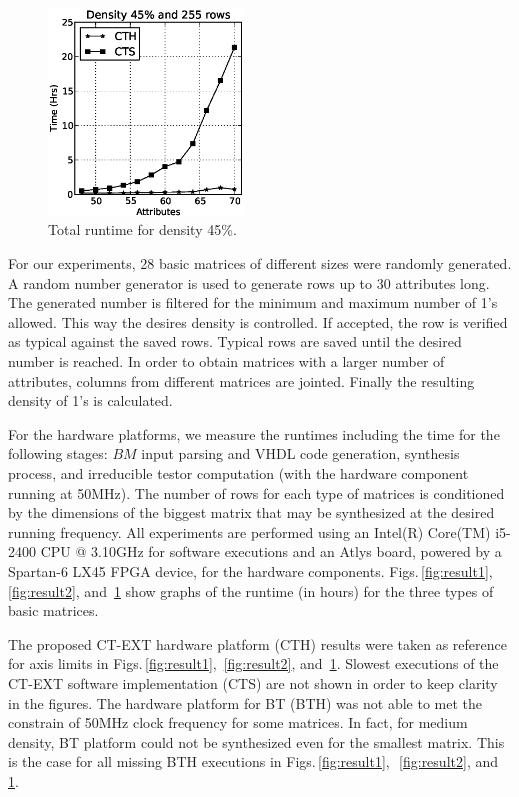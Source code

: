 \documentclass[authoryear,preprint,review,12pt]{elsarticle}
\begin{document}
\begin{figure}[htb]
    \begin{center}
       \includegraphics[height=5.5cm]{med48_density.eps}
    \end{center}
\caption{Total runtime for density 45\%.}
\label{fig:result3}
\end{figure}

For our experiments, 28 basic matrices of different sizes were randomly generated. 
A random number generator is used to generate rows up to 30 attributes long. The generated number is 
filtered for the minimum and maximum number of 1's allowed. This way the desires density is
controlled. If accepted, the row is verified as typical against the saved rows. Typical rows 
are saved until the desired number is reached. In order to obtain matrices with a larger
number of attributes, columns from different matrices are jointed. Finally the resulting 
density of 1's is calculated.

For the hardware platforms, we measure the runtimes including the time for the following stages: $BM$ input parsing 
and VHDL code generation, synthesis process, and irreducible testor computation (with the hardware 
component running at 50MHz). The number of rows for each type of matrices is conditioned by the dimensions of 
the biggest matrix that may be synthesized at the desired running frequency.
All experiments are performed using an Intel(R) Core(TM) i5-2400 CPU @ 3.10GHz for software executions and 
an Atlys board, powered by a Spartan-6 LX45 FPGA device, for the hardware components.
Figs.\,\ref{fig:result1}, \,\ref{fig:result2}, and \,\ref{fig:result3} show graphs of the runtime (in hours) 
for the three types of basic matrices. 

The proposed CT-EXT hardware platform (CTH) results were taken as reference for axis limits in 
Figs.\,\ref{fig:result1}, \,\ref{fig:result2}, and \,\ref{fig:result3}.
Slowest executions of the CT-EXT software implementation (CTS) are not shown in order to keep clarity in 
the figures. 
The hardware platform for BT (BTH) was not able to met the constrain of 50MHz clock frequency for some 
matrices. In fact, for medium  density, BT platform could not be synthesized even for the smallest matrix. 
This is the case for all missing BTH executions in Figs.\,\ref{fig:result1},~\,\ref{fig:result2}, and~\,\ref{fig:result3}.
\end{document}
